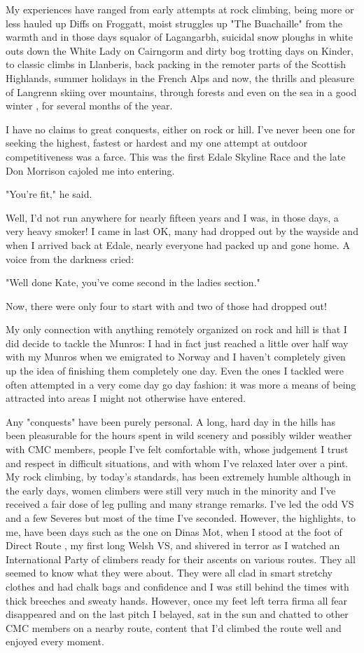 \documentclass[a5paper,openany,font 10pt]{scrbook}
\begin{document}
My experiences have ranged from early attempts at rock
climbing, being more or less hauled up Diffs on Froggatt, moist
struggles up "The Buachaille" from the warmth and  in those days
squalor of Lagangarbh, suicidal snow ploughs in white outs down
the White Lady on Cairngorm and dirty bog trotting days on
Kinder, to classic climbs in Llanberis, back packing in the
remoter parts of the Scottish Highlands, summer holidays in the
French Alps and now, the thrills and pleasure of Langrenn skiing
over mountains, through forests  and even on the sea in a good
winter , for several months of the year.

I have no claims to great conquests, either on rock or hill.
I've never been one for seeking the highest, fastest or hardest
and my one attempt at outdoor competitiveness was a farce. This
was the first Edale Skyline Race and the late Don Morrison
cajoled me into entering.

"You're fit," he said.

Well, I'd not run anywhere for nearly fifteen years and I
was, in those days, a very heavy smoker! I came in last  OK, many
had dropped out by the wayside  and when I arrived back at Edale,
nearly everyone had packed up and gone home. A voice from the
darkness cried:

"Well done Kate, you've come second in the ladies section."

Now, there were only four to start with and two of those had
dropped out!

My only connection with anything remotely organized on rock
and hill is that I did decide to tackle the Munros: I had in fact
just reached a little over half way with my Munros when we
emigrated to Norway and I haven't completely given up the idea of
finishing them completely one day. Even the ones I tackled were
often attempted in a very come day go day fashion: it was more a
means of being attracted into areas I might not otherwise have
entered.

Any "conquests" have been purely personal. A long, hard day
in the hills has been pleasurable for the hours spent in wild
scenery and possibly wilder weather with CMC members, people I've
felt comfortable with, whose judgement I trust and respect in
difficult situations, and with whom I've relaxed later over a
pint. My rock climbing, by today's standards, has been extremely
humble although in the early days, women climbers were still very
much in the minority and I've received a fair dose of leg pulling
and many strange remarks. I've led the odd VS and a few Severes
but most of the time I've seconded. However, the highlights, to
me, have been days such as the one on Dinas Mot, when I stood at
the foot of  Direct Route , my first long Welsh VS, and shivered in
terror as I watched an International Party of climbers ready for
their ascents on various routes. They all seemed to know what
they were about. They were all clad in smart stretchy clothes and
had chalk bags and confidence and I was still behind the times
with thick breeches and sweaty hands. However, once my feet left
terra firma all fear disappeared and on the last pitch I belayed,
sat in the sun and chatted to other CMC members on a nearby
route, content that I'd climbed the route well and enjoyed every
moment.
\end{document}
